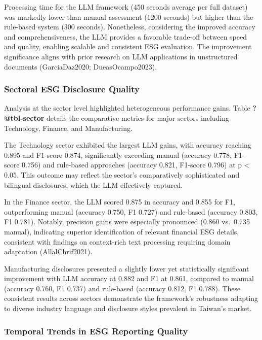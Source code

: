 \documentclass[
  12pt,
]{article}
\begin{document}
Processing time for the LLM framework (450 seconds average per full
dataset) was markedly lower than manual assessment (1200 seconds) but
higher than the rule-based system (300 seconds). Nonetheless,
considering the improved accuracy and comprehensiveness, the LLM
provides a favorable trade-off between speed and quality, enabling
scalable and consistent ESG evaluation. The improvement significance
aligns with prior research on LLM applications in unstructured documents
(GarciaDaz2020; DueasOcampo2023).

\subsubsection{Sectoral ESG Disclosure
Quality}\label{sectoral-esg-disclosure-quality}

Analysis at the sector level highlighted heterogeneous performance
gains. Table \textbf{?@tbl-sector} details the comparative metrics for
major sectors including Technology, Finance, and Manufacturing.

The Technology sector exhibited the largest LLM gains, with accuracy
reaching 0.895 and F1-score 0.874, significantly exceeding manual
(accuracy 0.778, F1-score 0.756) and rule-based approaches (accuracy
0.821, F1-score 0.796) at p \textless{} 0.05. This outcome may reflect
the sector's comparatively sophisticated and bilingual disclosures,
which the LLM effectively captured.

In the Finance sector, the LLM scored 0.875 in accuracy and 0.855 for
F1, outperforming manual (accuracy 0.750, F1 0.727) and rule-based
(accuracy 0.803, F1 0.781). Notably, precision gains were especially
pronounced (0.860 vs.~0.735 manual), indicating superior identification
of relevant financial ESG details, consistent with findings on
context-rich text processing requiring domain adaptation
(AllalChrif2021).

Manufacturing disclosures presented a slightly lower yet statistically
significant improvement with LLM accuracy at 0.882 and F1 at 0.861,
compared to manual (accuracy 0.760, F1 0.737) and rule-based (accuracy
0.812, F1 0.788). These consistent results across sectors demonstrate
the framework's robustness adapting to diverse industry language and
disclosure styles prevalent in Taiwan's market.

\subsubsection{Temporal Trends in ESG Reporting
Quality}\label{temporal-trends-in-esg-reporting-quality}
\end{document}
